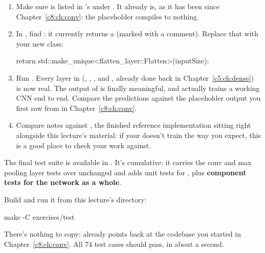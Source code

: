 \label{c10:ex:8}
\begin{enumerate}
  \item Make sure  is listed in 's
     under . It already is, as it has been since
    Chapter~\ref{c8:ch:conv}: the placeholder compiles to nothing.
  \item In , find : it currently
    returns a  (marked with a  comment). Replace that with
    your new class:
\begin{cppcode}
return std::make_unique<flatten_layer::Flatten>(inputSize);
\end{cppcode}
  \item Run . Every layer in  (, ,
    , and , already done back in Chapter~\ref{c5:ch:dense}) is now real.
    The output of  is finally meaningful, and  actually trains a
    working CNN end to end. Compare the predictions against the placeholder output you first saw
    from  in Chapter~\ref{c8:ch:conv}.
  \item Compare notes against , the finished reference implementation
    sitting right alongside this lecture's material: if your  doesn't train the way
    you expect, this is a good place to check your work against.
\end{enumerate}

\label{c10:set:3}

\label{c10:ex:9}
The final test suite is available in . It's cumulative:
it carries the conv and max pooling layer tests over unchanged and adds unit tests for
, plus \textbf{component tests for the network as a whole}.

Build and run it from this lecture's  directory:

\begin{shell}
make -C exercises/test
\end{shell}

\noindent There's nothing to copy:  already points back at the 
codebase you started in Chapter~\ref{c8:ch:conv}. All 74 test cases should pass, in about a second.

